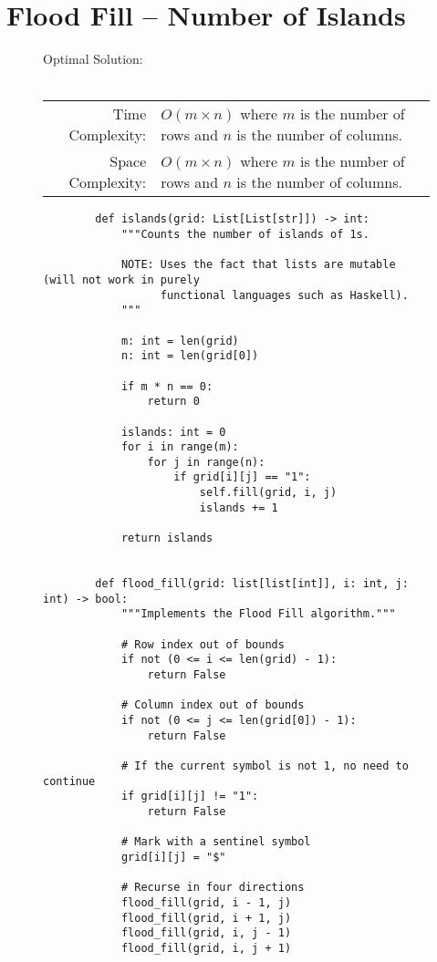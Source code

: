 
\section{Flood Fill -- Number of Islands}

\begin{figure}[H]
    Optimal Solution:\\\\
    \begin{tabular}{rl}
        Time Complexity:& \(O(m \times n)\) where \(m\) is the number of rows
        and \(n\) is the number of columns.\\
        Space Complexity:& \(O(m \times n)\) where \(m\) is the number of rows
        and \(n\) is the number of columns.
    \end{tabular}
\end{figure}

\begin{figure}[H]
    \centering
    \begin{verbatim}
        def islands(grid: List[List[str]]) -> int:
            """Counts the number of islands of 1s.

            NOTE: Uses the fact that lists are mutable (will not work in purely
                  functional languages such as Haskell).
            """

            m: int = len(grid)
            n: int = len(grid[0])

            if m * n == 0:
                return 0

            islands: int = 0
            for i in range(m):
                for j in range(n):
                    if grid[i][j] == "1":
                        self.fill(grid, i, j)
                        islands += 1

            return islands


        def flood_fill(grid: list[list[int]], i: int, j: int) -> bool:
            """Implements the Flood Fill algorithm."""

            # Row index out of bounds
            if not (0 <= i <= len(grid) - 1):
                return False

            # Column index out of bounds
            if not (0 <= j <= len(grid[0]) - 1):
                return False

            # If the current symbol is not 1, no need to continue
            if grid[i][j] != "1":
                return False

            # Mark with a sentinel symbol
            grid[i][j] = "$"

            # Recurse in four directions
            flood_fill(grid, i - 1, j)
            flood_fill(grid, i + 1, j)
            flood_fill(grid, i, j - 1)
            flood_fill(grid, i, j + 1)
    \end{verbatim}
\end{figure}
